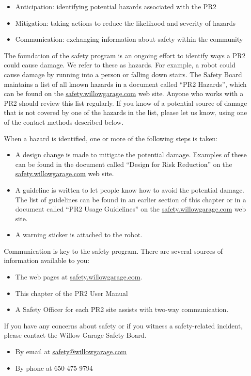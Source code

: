 \begin{itemize}
\item Anticipation: identifying potential hazards associated with the PR2
\item Mitigation: taking actions to reduce the likelihood and severity of hazards
\item Communication: exchanging information about safety within the community
\end{itemize}

The foundation of the safety program is an ongoing effort to identify ways a PR2 could cause damage. We refer to these as hazards. For example, a robot could cause damage by running into a person or falling down stairs. The Safety Board maintains a list of all known hazards in a document called “PR2 Hazards”, which can be found on the \href{http://safety.willowgarage.com}{safety.willowgarage.com} web site. Anyone who works with a PR2 should review this list regularly. If you know of a potential source of damage that is not covered by one of the hazards in the list, please let us know, using one of the contact methods described below.

When a hazard is identified, one or more of the following steps is taken:

\begin{itemize}
\item A design change is made to mitigate the potential damage. Examples of these can be found in the document called “Design for Risk Reduction” on the \href{http://safety.willowgarage.com}{safety.willowgarage.com} web site.
\item A guideline is written to let people know how to avoid the potential damage. The list of guidelines can be found in an earlier section of this chapter or in a document called “PR2 Usage Guidelines” on the \href{http://safety.willowgarage.com}{safety.willowgarage.com} web site.
\item A warning sticker is attached to the robot.
\end{itemize}

Communication is key to the safety program. There are several sources of information available to you:

\begin{itemize}
\item The web pages at \href{http://safety.willowgarage.com}{safety.willowgarage.com}.
\item This chapter of the PR2 User Manual
\item A Safety Officer for each PR2 site assists with two-way communication.
\end{itemize}

If you have any concerns about safety or if you witness a safety-related incident, please contact the Willow Garage Safety Board.

\begin{itemize}
\item By email at \href{mailto://safety@willowgarage.com}{safety@willowgarage.com}
\item By phone at 650-475-9794
\end{itemize}

